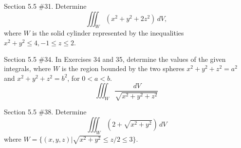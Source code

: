 \documentclass[12pt,letterpaper]{hmcpset}
\begin{document}
\newpage

\begin{problem}
Section 5.5 \#31. Determine
$$ \iiint_W (x^2 + y^2 + 2z^2) \,dV, $$
where $W$ is the solid cylinder represented by the inequalities $x^2 + y^2 \leq 4, -1 \leq z \leq 2$.
\end{problem}

\newpage

\begin{problem}
Section 5.5 \#34. In Exercises 34 and 35, determine the values of the given integrals, where $W$ is the region bounded by the two spheres $x^2 + y^2 + z^2 = a^2$ and $x^2 + y^2 + z^2 = b^2$, for $0 < a < b$.
$$ \iiint_W \frac{\,dV}{\sqrt{x^2 + y^2 + z^2}} $$
\end{problem}

\newpage

\begin{problem}
Section 5.5 \#38. Determine
$$ \iiint_W \left( 2 + \sqrt{x^2 + y^2} \right) \,dV$$
where $W=\{ (x, y, z) | \sqrt{x^2 + y^2} \leq z/2 \leq 3 \}$.
\end{problem}
\end{document}
